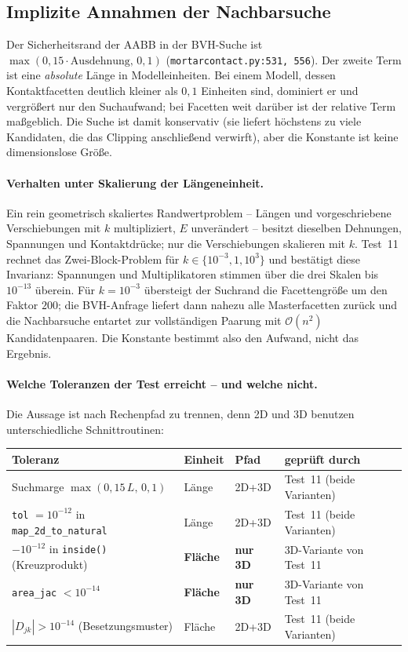 \documentclass[a4paper,11pt]{article}
\newcommand{\code}[1]{\texttt{\small #1}}
\newcommand{\file}[1]{\texttt{\small #1}}
\begin{document}
\subsection{Implizite Annahmen der Nachbarsuche}
Der Sicherheitsrand der AABB in der BVH-Suche ist
$\max(0{,}15\cdot\text{Ausdehnung},\,0{,}1)$ (\file{mortarcontact.py:\allowbreak{}531, 556}). Der
zweite Term ist eine \emph{absolute} Länge in Modelleinheiten. Bei einem Modell, dessen
Kontaktfacetten deutlich kleiner als $0{,}1$ Einheiten sind, dominiert er und vergrößert nur den
Suchaufwand; bei Facetten weit darüber ist der relative Term maßgeblich. Die Suche ist damit
konservativ (sie liefert höchstens zu viele Kandidaten, die das Clipping anschließend verwirft),
aber die Konstante ist keine dimensionslose Größe.

\paragraph{Verhalten unter Skalierung der Längeneinheit.}
Ein rein geometrisch skaliertes Randwertproblem -- Längen und vorgeschriebene Verschiebungen mit
$k$ multipliziert, $E$ unverändert -- besitzt dieselben Dehnungen, Spannungen und Kontaktdrücke;
nur die Verschiebungen skalieren mit $k$. Test~11 rechnet das Zwei-Block-Problem für
$k\in\{10^{-3},1,10^{3}\}$ und bestätigt diese Invarianz: Spannungen und Multiplikatoren stimmen
über die drei Skalen bis $10^{-13}$ überein. Für $k=10^{-3}$ übersteigt der Suchrand die
Facettengröße um den Faktor $200$; die BVH-Anfrage liefert dann nahezu alle Masterfacetten zurück
und die Nachbarsuche entartet zur vollständigen Paarung mit $\mathcal O(n^2)$ Kandidatenpaaren. Die
Konstante bestimmt also den Aufwand, nicht das Ergebnis.

\paragraph{Welche Toleranzen der Test erreicht -- und welche nicht.} Die Aussage ist nach
Rechenpfad zu trennen, denn 2D und 3D benutzen unterschiedliche Schnittroutinen:

\begin{center}
\small
\begin{tabularx}{\linewidth}{lllX}
\toprule
Toleranz & Einheit & Pfad & geprüft durch \\
\midrule
Suchmarge $\max(0{,}15\,L,\,0{,}1)$ & Länge & 2D+3D & Test~11 (beide Varianten) \\
\code{tol} $=10^{-12}$ in \code{map\_2d\_to\_natural} & Länge & 2D+3D & Test~11 (beide Varianten) \\
$-10^{-12}$ in \code{inside()} (Kreuzprodukt) & \textbf{Fläche} & \textbf{nur 3D} & 3D-Variante von Test~11 \\
\code{area\_jac} $<10^{-14}$ & \textbf{Fläche} & \textbf{nur 3D} & 3D-Variante von Test~11 \\
$|D_{jk}|>10^{-14}$ (Besetzungsmuster) & Fläche & 2D+3D & Test~11 (beide Varianten) \\
\bottomrule
\end{tabularx}
\end{center}
\end{document}
